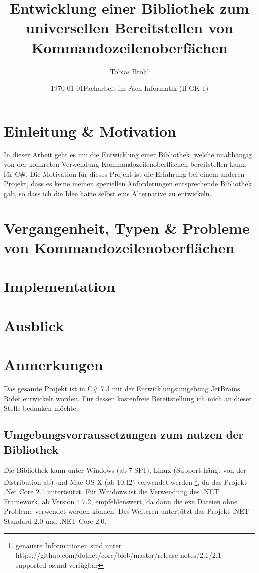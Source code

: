 \documentclass[a4paper,11pt,titlepage,ngerman]{article}
\title{Entwicklung einer Bibliothek zum universellen Bereitstellen von Kommandozeilenoberfächen}
\author{Tobias Brohl}
\date{\today \linebreak \linebreak Facharbeit im Fach Informatik (If GK 1)}
\begin{document}
 \begin{sloppypar}
  \maketitle
  \setcounter{tocdepth}{5}
  \setcounter{page}{0}
  \thispagestyle{empty}
  \tableofcontents
  \pagebreak
  \section{Einleitung \& Motivation}\label{sec:Intro}
  In dieser Arbeit geht es um die Entwicklung einer Bibliothek, welche unabhängig von der konkreten Verwendung Kommandozeilenoberflächen bereitstellen kann, für C\#.
  Die Motivation für dieses Projekt ist die Erfahrung bei einem anderen Projekt, dass es keine meinen speziellen Anforderungen entsprechende Bibliothek gab, 
  so dass ich die Idee hatte selbst eine Alternative zu entwickeln.
  \section{Vergangenheit, Typen \& Probleme von Kommandozeilenoberflächen}
  

  \section{Implementation}\label{sec:Content}
  

  \section{Ausblick}\label{sec:Future}
  

  \section{Anmerkungen}\label{sec:AdditionalNotes}
  Das gesamte Projekt ist in C\# 7.3 mit der Entwicklungsumgebung JetBrains Rider entwickelt worden.
  Für dessen kostenfreie Bereitstellung ich mich an dieser Stelle bedanken möchte.
  \subsection{Umgebungsvorraussetzungen zum nutzen der Bibliothek}\label{subsec:SystemRequirements}
   Die Bibliothek kann unter Windows (ab 7 SP1), Linux (Support hängt von der Distribution ab) und Mac OS X (ab 10.12) verwendet werden
  \footnote{genauere Informationen sind unter https://github.com/dotnet/core/blob/master/release-notes/2.1/2.1-supported-os.md verfügbar}, 
  da das Projekt .Net Core 2.1 untertsützt.
  Für Windows ist die Verwendung des .NET Framework, ab Version 4.7.2, empfehlenswert, da dann die exe Dateien ohne Probleme verwendet werden können.
  Des Weiteren untertützt das Projekt .NET Standard 
2.0 und .NET Core 2.0.

\end{sloppypar}
\end{document}
